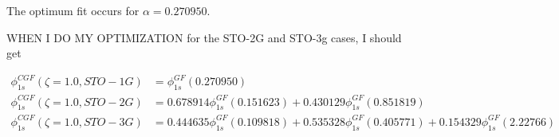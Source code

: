 \documentclass[11pt]{article}
\begin{document}
The optimum fit occurs for \(\alpha = 0.270950\). 


WHEN I DO MY OPTIMIZATION for the STO-2G and STO-3g cases, I should get

\begin{align*}
    \phi_{1s}^{CGF}(\zeta = 1.0, STO-1G) &= \phi_{1s}^{GF}(0.270950)\\
    \phi_{1s}^{CGF}(\zeta = 1.0, STO-2G) &= 0.678914 \phi_{1s}^{GF}(0.151623) + 0.430129 \phi_{1s}^{GF}(0.851819)\\
    \phi_{1s}^{CGF}(\zeta=1.0, STO-3G) &= 0.444635 \phi_{1s}^{GF}(0.109818) + 0.535328 \phi_{1s}^{GF}(0.405771) + 0.154329\phi_{1s}^{GF}(2.22766)
\end{align*}
\end{document}

